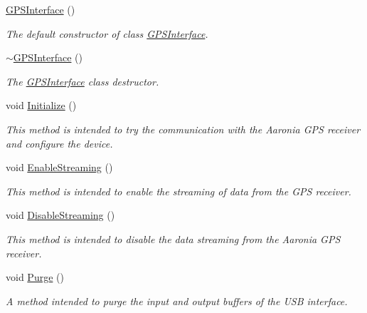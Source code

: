 \begin{DoxyCompactItemize}
\item 
\hyperlink{classGPSInterface_a91c9f19d6588bcd34a8038bdc036c20c}{G\+P\+S\+Interface} ()
\begin{DoxyCompactList}\small\item\em The default constructor of class \hyperlink{classGPSInterface}{G\+P\+S\+Interface}. \end{DoxyCompactList}\item 
\hyperlink{classGPSInterface_ac8156be0348867ab39ba6e7909e16c3b}{$\sim$\+G\+P\+S\+Interface} ()
\begin{DoxyCompactList}\small\item\em The \hyperlink{classGPSInterface}{G\+P\+S\+Interface} class\textquotesingle{} destructor. \end{DoxyCompactList}\item 
void \hyperlink{classGPSInterface_ac4a2712c98235f5ca2d826525180840b}{Initialize} ()
\begin{DoxyCompactList}\small\item\em This method is intended to try the communication with the Aaronia G\+PS receiver and configure the device. \end{DoxyCompactList}\item 
void \hyperlink{classGPSInterface_a9082fdd405532c59d4f085e62edc8ad7}{Enable\+Streaming} ()
\begin{DoxyCompactList}\small\item\em This method is intended to enable the streaming of data from the G\+PS receiver. \end{DoxyCompactList}\item 
\mbox{\label{classGPSInterface_a663c36374cc097040cb8945a3c25b190}} 
void \hyperlink{classGPSInterface_a663c36374cc097040cb8945a3c25b190}{Disable\+Streaming} ()
\begin{DoxyCompactList}\small\item\em This method is intended to disable the data streaming from the Aaronia G\+PS receiver. \end{DoxyCompactList}\item 
\mbox{\label{classGPSInterface_a698c9b38eaaa36fef1abcbc19614e2ad}} 
void \hyperlink{classGPSInterface_a698c9b38eaaa36fef1abcbc19614e2ad}{Purge} ()
\begin{DoxyCompactList}\small\item\em A method intended to purge the input and output buffers of the U\+SB interface. \end{DoxyCompactList}\item 

\end{DoxyCompactItemize}
